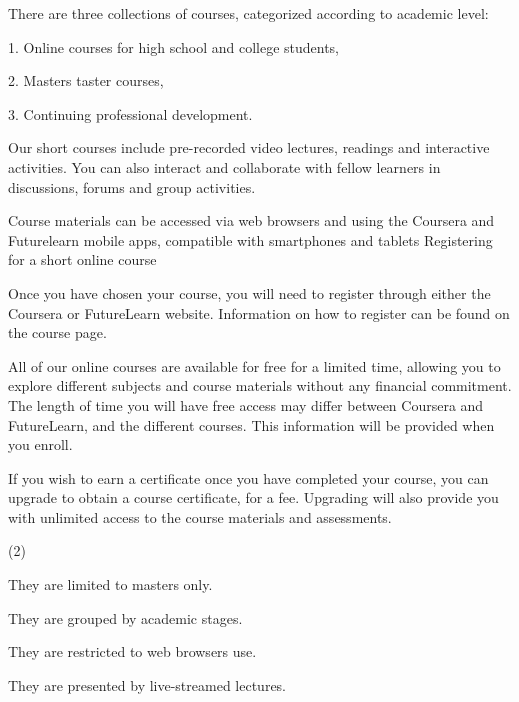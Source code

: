 \documentclass{英语试卷}
\begin{document}
\par There are three collections of courses, categorized according to academic level:\par
\par 1. Online courses for high school and college students,\par
\par 2. Masters taster courses,\par
\par 3. Continuing professional development.\par
\par Our short courses include pre-recorded video lectures, readings and interactive activities. You can also interact and collaborate with fellow learners in discussions, forums and group activities.\par
\par Course materials can be accessed via web browsers and using the Coursera and Futurelearn mobile apps, compatible with smartphones and tablets Registering for a short online course\par
\par Once you have chosen your course, you will need to register through either the Coursera or FutureLearn website. Information on how to register can be found on the course page.\par
\par All of our online courses are available for free for a limited time, allowing you to explore different subjects and course materials without any financial commitment. The length of time you will have free access may differ between Coursera and FutureLearn, and the different courses. This information will be provided when you enroll.\par
\par If you wish to earn a certificate once you have completed your course, you can upgrade to obtain a course certificate, for a fee. Upgrading will also provide you with unlimited access to the course materials and assessments.\par
{}
\begin{choices}(2)
  \item They are limited to masters only.
  \item They are grouped by academic stages.
  \item They are restricted to web browsers use.
  \item They are presented by live-streamed lectures.
\end{choices}
\end{document}
